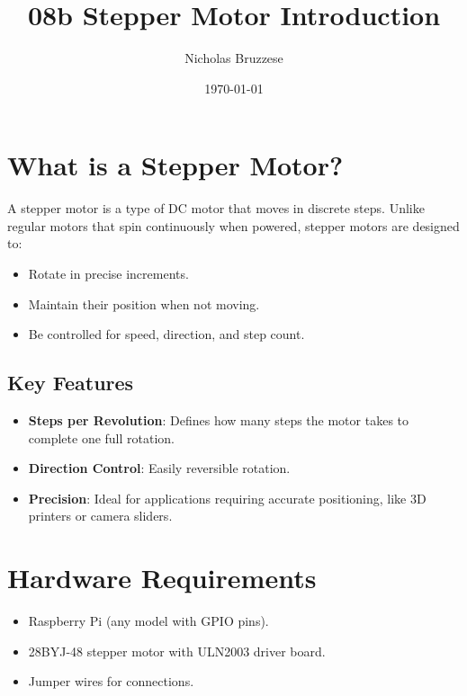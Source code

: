 \documentclass{article}
\title{08b Stepper Motor Introduction}
\author{Nicholas Bruzzese}
\date{\today}
\begin{document}
	
	\maketitle
	
	\section*{What is a Stepper Motor?}
	A stepper motor is a type of DC motor that moves in discrete steps. Unlike regular motors that spin continuously when powered, stepper motors are designed to:
	\begin{itemize}
		\item Rotate in precise increments.
		\item Maintain their position when not moving.
		\item Be controlled for speed, direction, and step count.
	\end{itemize}
	
	\subsection*{Key Features}
	\begin{itemize}
		\item \textbf{Steps per Revolution}: Defines how many steps the motor takes to complete one full rotation.
		\item \textbf{Direction Control}: Easily reversible rotation.
		\item \textbf{Precision}: Ideal for applications requiring accurate positioning, like 3D printers or camera sliders.
	\end{itemize}
	
	\section*{Hardware Requirements}
	\begin{itemize}
		\item Raspberry Pi (any model with GPIO pins).
		\item 28BYJ-48 stepper motor with ULN2003 driver board.
		\item Jumper wires for connections.
	\end{itemize}
	
\end{document}

